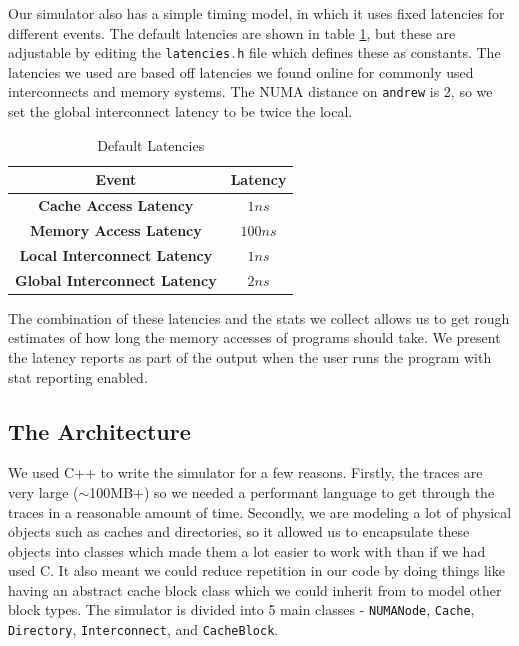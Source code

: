 \documentclass{article}
\def\inline{\lstinline[language=C++, basicstyle=\ttfamily]}
\begin{document}
Our simulator also has a simple timing model, in which it uses fixed latencies for different events. The default latencies are shown in table \ref{table:latencies}, but these are adjustable by editing the \inline{latencies.h} file which defines these as constants. The latencies we used are based off latencies we found online for commonly used interconnects and memory systems.  The NUMA distance on \inline{andrew} is 2, so we set the global interconnect latency to be twice the local.
\begin{table}[H]
    \centering
    \begin{tabular}{| c | c |}
        \hline
        \textbf{Event} & \textbf{Latency} \\
        \hline \hline
        \textbf{Cache Access Latency} & $1ns$ \\
        \hline
        \textbf{Memory Access Latency} & $100ns$ \\
        \hline
        \textbf{Local Interconnect Latency} & $1ns$ \\
        \hline
        \textbf{Global Interconnect Latency} & $2ns$ \\
        \hline
    \end{tabular}
    \caption{Default Latencies}
    \label{table:latencies}
\end{table}

The combination of these latencies and the stats we collect allows us to get rough estimates of how long the memory accesses of programs should take.  We present the latency reports as part of the output when the user runs the program with stat reporting enabled.

\subsection{The Architecture}
We used C++ to write the simulator for a few reasons.  Firstly, the traces are very large ($\sim$100MB+) so we needed a performant language to get through the traces in a reasonable amount of time.  Secondly, we are modeling a lot of physical objects such as caches and directories, so it allowed us to encapsulate these objects into classes which made them a lot easier to work with than if we had used C.  It also meant we could reduce repetition in our code by doing things like having an abstract cache block class which we could inherit from to model other block types. The simulator is divided into 5 main classes - \inline{NUMANode}, \inline{Cache}, \inline{Directory}, \inline{Interconnect}, and \inline{CacheBlock}.
\end{document}
